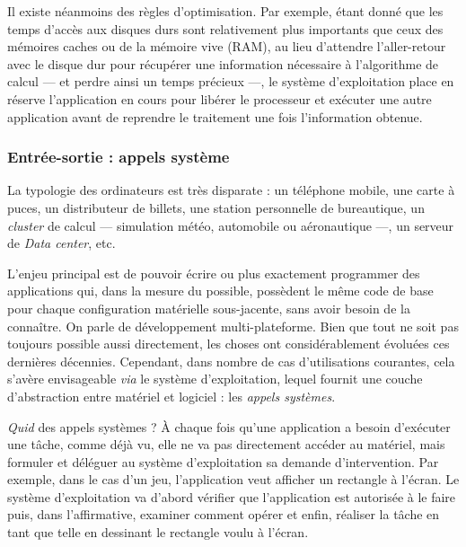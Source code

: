 Il existe néanmoins des règles d'optimisation. Par exemple, étant donné que les temps d'accès aux disques durs sont relativement plus importants que ceux des mémoires caches ou de la mémoire vive (RAM), au lieu d'attendre l'aller-retour avec le disque dur pour récupérer une information nécessaire à l'algorithme de calcul --- et perdre ainsi un temps précieux ---, le système d'exploitation place en réserve l'application en cours pour libérer le processeur et exécuter une autre application avant de reprendre le traitement une fois l'information obtenue.

\subsubsection[Appels système]{Entrée-sortie : appels système}
\label{subsub:I.2.1.3}

La typologie des ordinateurs est très disparate : un téléphone mobile, une carte à puces, un distributeur de billets, une station personnelle de bureautique, un \textit{cluster} de calcul --- simulation météo, automobile ou aéronautique ---, un serveur de \textit{Data center}, etc.

L'enjeu principal est de pouvoir écrire ou plus exactement programmer des applications qui, dans la mesure du possible, possèdent le même code de base pour chaque configuration matérielle sous-jacente, sans avoir besoin de la connaître. On parle de développement multi-plateforme. Bien que tout ne soit pas toujours possible aussi directement, les choses ont considérablement évoluées ces dernières décennies. Cependant, dans nombre de cas d'utilisations courantes, cela s'avère envisageable \textit{via} le système d'exploitation, lequel fournit une couche d'abstraction entre matériel et logiciel : les \emph{appels systèmes}.

\textit{Quid} des appels systèmes ? À chaque fois qu'une application a besoin d'exécuter une tâche, comme déjà vu, elle ne va pas directement accéder au matériel, mais formuler et déléguer au système d'exploitation sa demande d'intervention. Par exemple, dans le cas d'un jeu, l'application veut afficher un rectangle à l'écran. Le système d'exploitation va d'abord vérifier que l'application est autorisée à le faire puis, dans l'affirmative, examiner comment opérer et enfin, réaliser la tâche en tant que telle en dessinant le rectangle voulu à l'écran.

